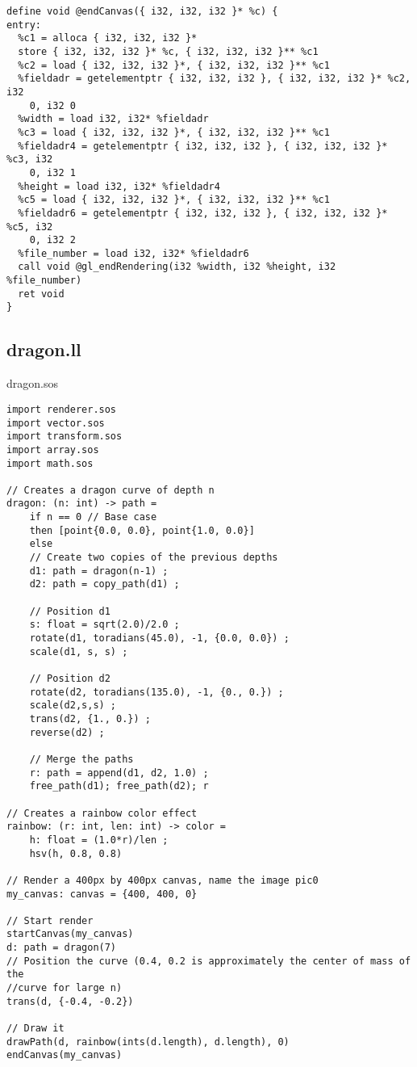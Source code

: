 \documentclass[main.tex]{subfiles}
\begin{document}
{\begin{lstlisting}
define void @endCanvas({ i32, i32, i32 }* %c) {
entry:
  %c1 = alloca { i32, i32, i32 }*
  store { i32, i32, i32 }* %c, { i32, i32, i32 }** %c1
  %c2 = load { i32, i32, i32 }*, { i32, i32, i32 }** %c1
  %fieldadr = getelementptr { i32, i32, i32 }, { i32, i32, i32 }* %c2, i32 
    0, i32 0
  %width = load i32, i32* %fieldadr
  %c3 = load { i32, i32, i32 }*, { i32, i32, i32 }** %c1
  %fieldadr4 = getelementptr { i32, i32, i32 }, { i32, i32, i32 }* %c3, i32 
    0, i32 1
  %height = load i32, i32* %fieldadr4
  %c5 = load { i32, i32, i32 }*, { i32, i32, i32 }** %c1
  %fieldadr6 = getelementptr { i32, i32, i32 }, { i32, i32, i32 }* %c5, i32 
    0, i32 2
  %file_number = load i32, i32* %fieldadr6
  call void @gl_endRendering(i32 %width, i32 %height, i32 %file_number)
  ret void
}
\end{lstlisting}}

\subsection{dragon.ll}
\colorbox{blue!30}{dragon.sos}
	\begin{lstlisting}
import renderer.sos
import vector.sos
import transform.sos
import array.sos
import math.sos

// Creates a dragon curve of depth n
dragon: (n: int) -> path =
    if n == 0 // Base case
    then [point{0.0, 0.0}, point{1.0, 0.0}]
    else
    // Create two copies of the previous depths
    d1: path = dragon(n-1) ;
    d2: path = copy_path(d1) ;

    // Position d1
    s: float = sqrt(2.0)/2.0 ;
    rotate(d1, toradians(45.0), -1, {0.0, 0.0}) ;
    scale(d1, s, s) ;

    // Position d2
    rotate(d2, toradians(135.0), -1, {0., 0.}) ;
    scale(d2,s,s) ;
    trans(d2, {1., 0.}) ;
    reverse(d2) ;

    // Merge the paths
    r: path = append(d1, d2, 1.0) ;
    free_path(d1); free_path(d2); r

// Creates a rainbow color effect
rainbow: (r: int, len: int) -> color =
    h: float = (1.0*r)/len ;
    hsv(h, 0.8, 0.8)

// Render a 400px by 400px canvas, name the image pic0
my_canvas: canvas = {400, 400, 0}

// Start render
startCanvas(my_canvas)
d: path = dragon(7)
// Position the curve (0.4, 0.2 is approximately the center of mass of the 
//curve for large n)
trans(d, {-0.4, -0.2})

// Draw it
drawPath(d, rainbow(ints(d.length), d.length), 0)
endCanvas(my_canvas)
\end{lstlisting}
\end{document}
